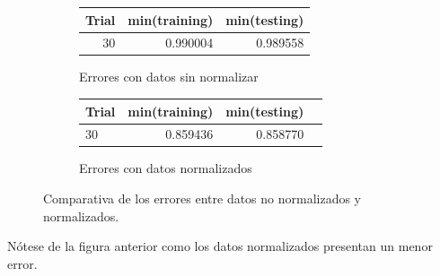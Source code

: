 \documentclass{article}
\begin{document}
\begin{figure}[htbp]
    \centering
    \begin{subfigure}{0.49\textwidth}
        \centering
        \begin{tabular}{rrr}
        \toprule
         Trial & min(training) & min(testing) \\
        \midrule
        30 & 0.990004 & 0.989558 \\
        \bottomrule
        \end{tabular}
        \caption{Errores con datos sin normalizar}
        \label{fig:basic}
    \end{subfigure}
    \hfill
    \begin{subfigure}{0.49\textwidth}
        \centering
       \begin{tabular}{lrrr}
        \toprule
        Trial & min(training) & min(testing) \\
        \midrule
        30 & 0.859436 & 0.858770 \\
        \bottomrule
        \end{tabular}

        \caption{Errores con datos normalizados}
        \label{fig:normalized}
    \end{subfigure}
    \caption{Comparativa de los errores entre datos no normalizados y normalizados.}
    \label{fig:comparativa}
\end{figure}

Nótese de la figura anterior como los datos normalizados presentan un menor error.

\newpage


\end{document}
